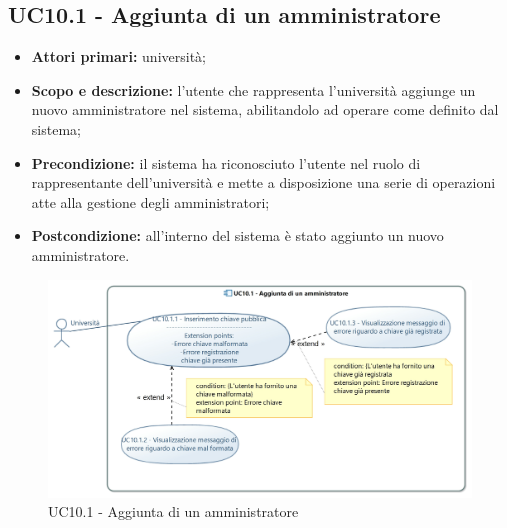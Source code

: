\documentclass[AnalisiDeiRequisiti.tex]{subfiles}
\begin{document}
\subsection{UC10.1 - Aggiunta di un amministratore}
\begin{itemize}
	\item \textbf{Attori primari:} università;
	\item \textbf{Scopo e descrizione:} l'utente che rappresenta l'università aggiunge un nuovo amministratore nel sistema, abilitandolo ad operare come definito dal sistema;
	\item \textbf{Precondizione:} il sistema ha riconosciuto l'utente nel ruolo di rappresentante dell'università e mette a disposizione una serie di operazioni atte alla gestione degli amministratori; 
	\item \textbf{Postcondizione:} all'interno del sistema è stato aggiunto un nuovo amministratore.
\end{itemize}

\begin{figure}[H]
	\centering
	\includegraphics[width=1.0\linewidth]{UC10_1.jpg}
	\caption{UC10.1 - Aggiunta di un amministratore}
	\label{fig:UC10.1 - Aggiunta di un amministratore}
\end{figure}
\end{document}
